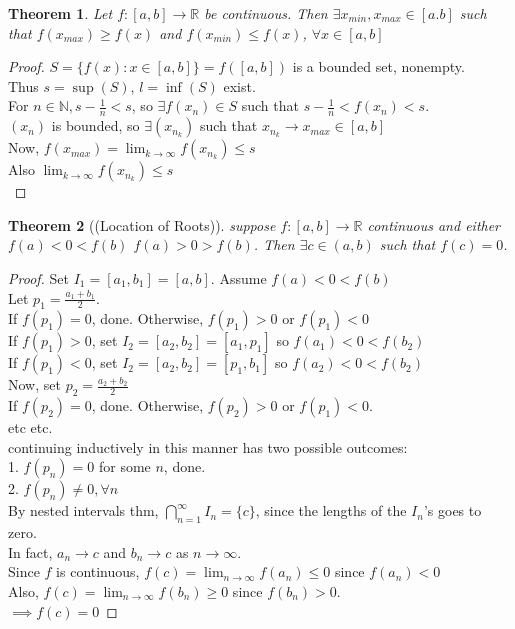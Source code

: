 \documentclass{report}
\newcommand{\N}{\mathbb{N}}  %
\newcommand{\R}{\mathbb{R}}  %
\newcommand{\xn}{(x_n)}
\newcommand{\xnkp}{(x_{n_k})}
\newcommand{\xnk}{x_{n_k}}
\theoremstyle{mystyle}
\newtheorem*{theorem}{Theorem}
\theoremstyle{customtheorem}
\begin{document}
    \begin{theorem}
        Let $f:[a,b]\to \R$ be continuous. Then $\exists x_{min}, x_{max} \in [a.b]$ such that $f(x_{max})\geq f(x)$ and $f(x_{min})\leq f(x)$, $\forall x\in[a,b]$
    \end{theorem}\vspace{-1.25em}
    \begin{proof}
        $S=\{f(x):x\in[a,b]\}=f([a,b])$ is a bounded set, nonempty.\\
        Thus $s=\sup(S)$, $l=\inf(S)$ exist. \\
        For $n\in \N, s-\frac{1}{n}<s$, so $\exists f(x_n)\in S$ such that $s-\frac{1}{n}<f(x_n)<s$.\\
        $\xn$ is bounded, so $\exists\xnkp$ such that $\xnk \to x_{max}\in[a,b]$\\
        Now, $f(x_{max})=\lim_{k\to\infty}f\xnkp\leq s$\\
        Also $\lim_{k\to\infty}f\xnkp\leq s$ \\
    \end{proof}

    \begin{theorem}[(Location of Roots)]
        suppose $f:[a,b]\to\R$ continuous and either $f(a)<0<f(b)$  $f(a)>0>f(b)$.
        Then $\exists c\in(a,b)$ such that $f(c)=0$.
    \end{theorem}
    \begin{proof}
        Set $I_1=[a_1,b_1]=[a,b]$. Assume $f(a)<0<f(b)$ \\
        Let $p_1=\frac{a_1+b_1}{2}$. \\
        If $f(p_1)=0$, done. Otherwise, $f(p_1) > 0$ or $f(p_1) < 0$\\
        If $f(p_1) > 0$, set $I_2=[a_2,b_2]=[a_1,p_1]$ so $f(a_1)<0<f(b_2)$ \\
        If $f(p_1) < 0$, set $I_2=[a_2,b_2]=[p_1,b_1]$ so $f(a_2)<0<f(b_2)$ \\
        Now, set $p_2=\frac{a_2+b_2}{2}$\\
        If $f(p_2)=0$, done. Otherwise, $f(p_2) > 0$ or $f(p_1) < 0$.\\
        etc etc. \\
        continuing inductively in this manner has two possible outcomes:\\
        1. $f(p_n)=0$ for some $n$, done.\\
        2. $f(p_n)\neq 0, \forall n$\\
        By nested intervals thm, $\bigcap_{n=1}^{\infty}I_n=\{c\}$, since the lengths of the $I_n$'s goes to zero. \\
        In fact, $a_n\to c$ and $b_n\to c$ as $n\to\infty$. \\
        Since $f$ is continuous, $f(c)=\lim_{n\to \infty}f(a_n)\leq 0$ since $f(a_n)<0$\\
        Also, $f(c)=\lim_{n\to \infty}f(b_n)\geq 0$ since $f(b_n)>0$. \\
        $\implies f(c)=0$
    \end{proof}
\end{document}
